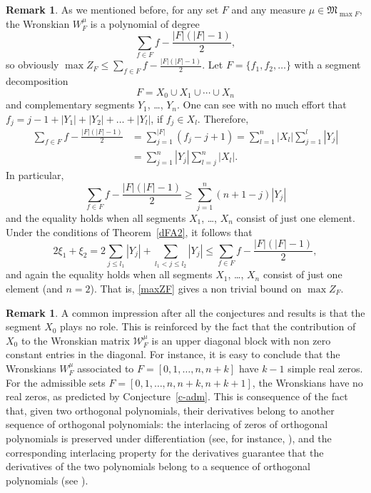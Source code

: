 \documentclass[10pt]{article}
\theoremstyle{plain}
\theoremstyle{definition}
\newtheorem{remark}[theorem]{Remark}
\numberwithin{equation}{section} %
\newcommand\W{\mathcal{W}}
\newcommand\M{\mathfrak{M}}
\begin{document}
\begin{remark}
As we mentioned before, for any set $F$ and any measure $\mu \in \M_{\max F}$, the Wronskian $W^\mu_F$ is a polynomial of degree
\[
   \sum_{f \in F} f - \frac{|F| (|F|-1)}{2},
\]
so obviously $\max Z_F \leq \sum_{f \in F} f - \frac{|F| (|F|-1)}{2}$.
Let $F = \{f_1, f_2, \dots\}$ with a segment decomposition
\[
   F = X_0 \cup X_1 \cup \dotsb \cup X_n
\]
and complementary segments $Y_1$, \dots, $Y_n$. One can see with no much effort that $f_j = j-1 + |Y_1| + |Y_2| + \dots + |Y_l|$, if $f_j \in X_l$. Therefore,
\begin{align*}
   \sum_{f \in F} f - \frac{|F| (|F|-1)}{2}
   &= \sum_{j=1}^{|F|} (f_j - j + 1)
   = \sum_{l=1}^n |X_l| \sum_{j=1}^l |Y_j|
   \\
   &= \sum_{j=1}^n |Y_j| \sum_{l=j}^n |X_l|.
\end{align*}
In particular,
\[
   \sum_{f \in F} f - \frac{|F| (|F|-1)}{2}
   \geq \sum_{j=1}^n (n+1-j) |Y_j|
\]
and the equality holds when all segments $X_1$, \dots, $X_n$ consist of just
one element.
Under the conditions of Theorem~\ref{dFA2}, it follows that
\[
   2\xi_1 + \xi_2 = 2 \sum_{j\leq l_1} |Y_j|
   + \sum_{l_1 < j \leq l_2} |Y_j|
   \leq \sum_{f \in F} f - \frac{|F| (|F|-1)}{2},
\]
and again the equality holds when all segments $X_1$, \dots, $X_n$ consist of
just one element (and $n=2$). That is, \eqref{maxZF} gives a non trivial
bound on $\max Z_F$.
\end{remark}

\begin{remark}
A common impression after all the conjectures and results is that the segment $X_0$ plays no role. This is reinforced by the fact that the contribution of $X_0$ to the Wronskian matrix $\W _F^\mu$ is an upper diagonal block with non zero constant entries in the diagonal. For instance, it is easy to conclude that the Wronskians $W_F^\mu$ associated to $F=[0,1,\dots,n,n+k]$ have $k-1$ simple real zeros. For the admissible sets $F=[0,1,\dots,n,n+k,n+k+1]$, the Wronskians have no real zeros, as predicted by Conjecture~\ref{c-adm}. This is consequence of the fact that, given two orthogonal polynomials, their derivatives belong to another sequence of orthogonal polynomials: the interlacing of zeros of orthogonal polynomials is preserved under differentiation (see, for instance, \cite[Theorem 1.47]{Fi}), and the corresponding interlacing property for the derivatives guarantee that the derivatives of the two polynomials belong to a sequence of orthogonal polynomials (see \cite{We}).
\end{remark}
\end{document}
